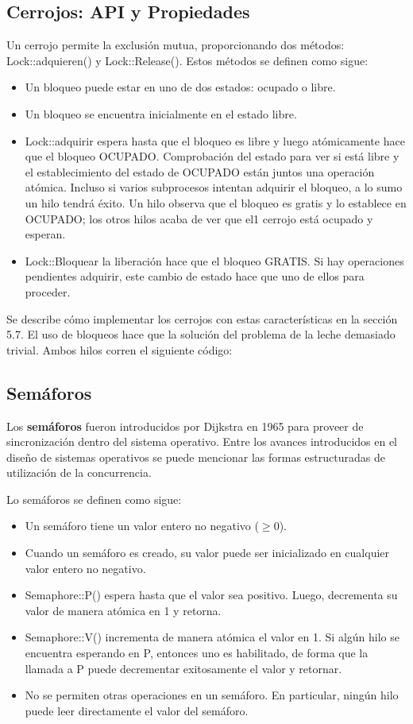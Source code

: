 \documentclass[10pt]{book}
\begin{document}
\subsection{Cerrojos: API y Propiedades}
Un cerrojo permite la exclusión mutua, proporcionando dos métodos: Lock::adquieren() y Lock::Release(). Estos métodos se definen como sigue:
\begin{itemize}
\item Un bloqueo puede estar en uno de dos estados: ocupado o libre.
\item Un bloqueo se encuentra inicialmente en el estado libre.
\item Lock::adquirir espera hasta que el bloqueo es libre y luego atómicamente hace que el bloqueo OCUPADO. Comprobación del estado para ver si está libre y el establecimiento del estado de OCUPADO están juntos una operación atómica. Incluso si varios subprocesos intentan adquirir el bloqueo, a lo sumo un hilo tendrá éxito. Un hilo observa que el bloqueo es gratis y lo establece en OCUPADO; los otros hilos acaba de ver que el1 cerrojo está ocupado y esperan.
\item Lock::Bloquear la liberación hace que el bloqueo GRATIS. Si hay operaciones pendientes adquirir, este cambio de estado hace que uno de ellos para proceder.
\end{itemize}

Se describe cómo implementar los cerrojos con estas características en la sección 5.7. El uso de bloqueos hace que la solución del problema de la leche demasiado trivial. Ambos hilos corren el siguiente código:


\subsection{Semáforos}
Los \textbf{semáforos} fueron introducidos por Dijkstra en 1965 para proveer de sincronización dentro del sistema operativo. Entre los avances introducidos en el diseño de sistemas operativos se puede mencionar las formas estructuradas de utilización de la concurrencia.

Lo semáforos se definen como sigue:
\begin{itemize}
\item Un semáforo tiene un valor entero no negativo ($\geq 0$).
\item Cuando un semáforo es creado, su valor puede ser inicializado en cualquier valor entero no negativo.
\item {\mf Semaphore::P()} espera hasta que el valor sea positivo. Luego, decrementa su valor de manera atómica en 1 y retorna.
\item {\mf Semaphore::V()} incrementa de manera atómica el valor en 1. Si algún hilo se encuentra esperando en {\mf P}, entonces uno es habilitado, de forma que la llamada a {\mf P} puede decrementar exitosamente el valor y retornar.
\item No se permiten otras operaciones en un semáforo. En particular, ningún hilo puede leer directamente el valor del semáforo.
\end{itemize}
\end{document}
